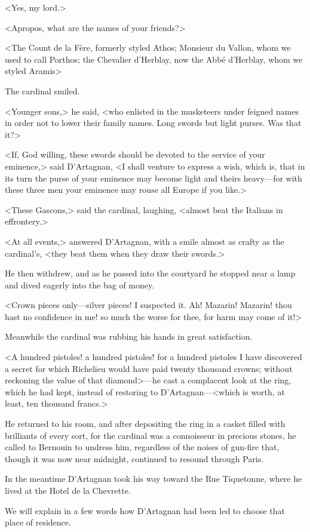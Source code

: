 <Yes, my lord.>

<Apropos, what are the names of your friends?>

<The Count de la Fère, formerly styled Athos; Monsieur du Vallon, whom we used to call Porthos; the Chevalier d'Herblay, now the Abbé d'Herblay, whom we styled Aramis\longdash>

The cardinal smiled.

<Younger sons,> he said, <who enlisted in the musketeers under feigned names in order not to lower their family names. Long swords but light purses. Was that it?>

<If, God willing, these swords should be devoted to the service of your eminence,> said D'Artagnan, <I shall venture to express a wish, which is, that in its turn the purse of your eminence may become light and theirs heavy—for with these three men your eminence may rouse all Europe if you like.>

<These Gascons,> said the cardinal, laughing, <almost beat the Italians in effrontery.>

<At all events,> answered D'Artagnan, with a smile almost as crafty as the cardinal's, <they beat them when they draw their swords.>

He then withdrew, and as he passed into the courtyard he stopped near a lamp and dived eagerly into the bag of money.

<Crown pieces only—silver pieces! I suspected it. Ah! Mazarin! Mazarin! thou hast no confidence in me! so much the worse for thee, for harm may come of it!>

Meanwhile the cardinal was rubbing his hands in great satisfaction.

<A hundred pistoles! a hundred pistoles! for a hundred pistoles I have discovered a secret for which Richelieu would have paid twenty thousand crowns; without reckoning the value of that diamond>—he cast a complacent look at the ring, which he had kept, instead of restoring to D'Artagnan—<which is worth, at least, ten thousand francs.>

He returned to his room, and after depositing the ring in a casket filled with brilliants of every sort, for the cardinal was a connoisseur in precious stones, he called to Bernouin to undress him, regardless of the noises of gun-fire that, though it was now near midnight, continued to resound through Paris.

In the meantime D'Artagnan took his way toward the Rue Tiquetonne, where he lived at the Hotel de la Chevrette.

We will explain in a few words how D'Artagnan had been led to choose that place of residence. 